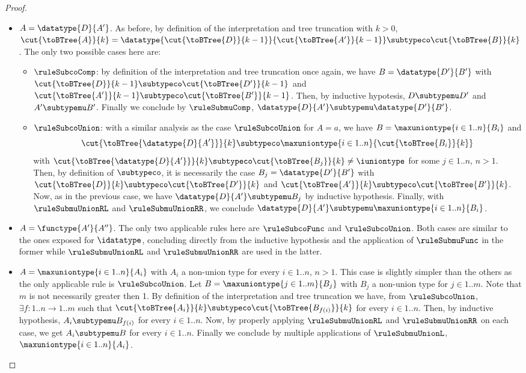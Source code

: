 \begin{proof}
\begin{itemize}
  \item $A = \datatype{D}{A'}$. As before, by definition of the interpretation
  and tree truncation with $k > 0$, $\cut{\toBTree{A}}{k} =
  \datatype{\cut{\toBTree{D}}{k-1}}{\cut{\toBTree{A'}}{k-1}} \subtypeco
  \cut{\toBTree{B}}{k}$. The only two possible cases here are:
  \begin{itemize}
    \item $\ruleSubcoComp$: by definition of the interpretation and tree
    truncation once again, we have $B = \datatype{D'}{B'}$ with
    $\cut{\toBTree{D}}{k-1} \subtypeco \cut{\toBTree{D'}}{k-1}$ and
    $\cut{\toBTree{A'}}{k-1} \subtypeco \cut{\toBTree{B'}}{k-1}$. Then, by
    inductive hypotesis, $D \subtypemu D'$ and $A' \subtypemu B'$. Finally we
    conclude by $\ruleSubmuComp$, $\datatype{D}{A'} \subtypemu
    \datatype{D'}{B'}$.
    
    \item $\ruleSubcoUnion$: with a similar analysis as the case
    $\ruleSubcoUnion$ for $A = a$, we have $B = \maxuniontype{i \in 1..n}{B_i}$
    and $$\cut{\toBTree{\datatype{D}{A'}}}{k} \subtypeco \maxuniontype{i \in
    1..n}{\cut{\toBTree{B_i}}{k}}$$ with $\cut{\toBTree{\datatype{D}{A'}}}{k}
    \subtypeco \cut{\toBTree{B_j}}{k} \neq \iuniontype$ for some $j \in 1..n$,
    $n > 1$. Then, by definition of $\subtypeco$, it is necessarily the case
    $B_j = \datatype{D'}{B'}$ with $\cut{\toBTree{D}}{k} \subtypeco
    \cut{\toBTree{D'}}{k}$ and $\cut{\toBTree{A'}}{k} \subtypeco
    \cut{\toBTree{B'}}{k}$. Now, as in the previous case, we have
    $\datatype{D}{A'} \subtypemu B_j$ by inductive hypothesis. Finally, with
    $\ruleSubmuUnionRL$ and $\ruleSubmuUnionRR$, we conclude $\datatype{D}{A'}
    \subtypemu \maxuniontype{i \in 1..n}{B_i}$.
  \end{itemize}
  
  \item $A = \functype{A'}{A''}$. The only two applicable rules here are
  $\ruleSubcoFunc$ and $\ruleSubcoUnion$. Both cases are similar to the ones
  exposed for $\idatatype$, concluding directly from the inductive hypothesis
  and the application of $\ruleSubmuFunc$ in the former while
  $\ruleSubmuUnionRL$ and $\ruleSubmuUnionRR$ are used in the latter.
  
  \item $A = \maxuniontype{i \in 1..n}{A_i}$ with $A_i$ a non-union type for
  every $i \in 1..n$, $n > 1$. This case is slightly simpler than the others as
  the only applicable rule is $\ruleSubcoUnion$. Let $B = \maxuniontype{j \in
  1..m}{B_j}$ with $B_j$ a non-union type for $j \in 1..m$. Note that $m$ is
  not necessarily greater then 1. By definition of the interpretation and tree
  truncation we have, from $\ruleSubcoUnion$, $\exists f : 1..n \to 1..m$ such
  that $\cut{\toBTree{A_i}}{k} \subtypeco \cut{\toBTree{B_{f(i)}}}{k}$ for
  every $i \in 1..n$. Then, by inductive hypothesis, $A_i \subtypemu B_{f(i)}$
  for every $i \in 1..n$. Now, by properly applying $\ruleSubmuUnionRL$ and
  $\ruleSubmuUnionRR$ on each case, we get $A_i \subtypemu B$ for every $i \in
  1..n$. Finally we conclude by multiple applications of $\ruleSubmuUnionL$,
  $\maxuniontype{i \in 1..n}{A_i}$.
  

\end{itemize}
\end{proof}

